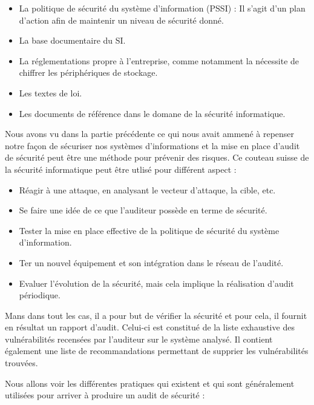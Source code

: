 \documentclass[a4paper]{memoir}
\begin{document}
\begin{itemize}
  \item La politique de sécurité du système d'information (PSSI) : Il s'agit d'un plan d'action afin de maintenir un niveau de sécurité donné.
  \item La base documentaire du SI.
  \item La réglementations propre à l'entreprise, comme notamment la nécessite de chiffrer les périphériques de stockage.
  \item Les textes de loi.
    \item Les documents de référence dans le domane de la sécurité informatique.\\
\end{itemize}

Nous avons vu dans la partie précédente ce qui nous avait ammené à repenser notre façon de sécuriser nos systèmes d'informations et la mise en place d'audit de sécurité peut être une méthode pour prévenir des risques. Ce couteau suisse de la sécurité informatique peut être utlisé pour différent aspect :

\begin{itemize}
\item Réagir à une attaque, en analysant le vecteur d'attaque, la cible, etc.
\item Se faire une idée de ce que l'auditeur possède en terme de sécurité.
\item Tester la mise en place effective de la politique de sécurité du système d'information.
\item Ter un nouvel équipement et son intégration dans le réseau de l'audité.
\item Evaluer l'évolution de la sécurité, mais cela implique la réalisation d'audit périodique.\\
\end{itemize}

Mans dans tout les cas, il a pour but de vérifier la sécurité et pour cela, il fournit en résultat un rapport d'audit. Celui-ci est constitué de la liste exhaustive des vulnérabilités recensées par l'auditeur sur le système analysé. Il contient également une liste de recommandations permettant de supprier les vulnérabilités trouvées.

Nous allons voir les différentes pratiques qui existent et qui sont généralement utilisées pour arriver à produire un audit de sécurité :\\
\end{document}
